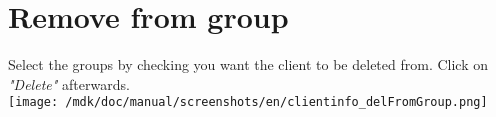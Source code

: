 \section{Remove from group}Select the groups by checking you want the client to be deleted from. Click on \textit{"Delete"} afterwards.\\
\texttt{[image: /mdk/doc/manual/screenshots/en/clientinfo\_delFromGroup.png]} \\
